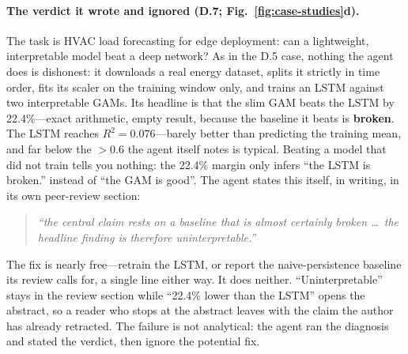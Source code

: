 \paragraph{The verdict it wrote and ignored (D.7; Fig.~\ref{fig:case-studies}d).}
The task is HVAC load forecasting for edge deployment: can a lightweight,
interpretable model beat a deep network? As in the D.5 case, nothing the agent
does is dishonest: it downloads a real energy dataset, splits it strictly in
time order, fits its scaler on the training window only, and trains an LSTM
against two interpretable GAMs. Its headline is that the slim GAM beats the LSTM
by 22.4\%---exact arithmetic, empty result, because the baseline it beats is
\textbf{broken}. The LSTM reaches $R^2 = 0.076$---barely better than predicting the
training mean, and far below the ${>}0.6$ the agent itself notes is typical.
Beating a model that did not train tells you nothing: the 22.4\% margin only infers ``the LSTM is broken.'' instead of ``the GAM is good''. The agent states this
itself, in writing, in its own peer-review section:
%
\begin{quote}\small\itshape
``the central claim rests on a baseline that is almost certainly broken \dots\
the headline finding is therefore uninterpretable.''
\end{quote}
%
The fix is nearly free---retrain the LSTM, or report the naive-persistence
baseline its review calls for, a single line either way. It does neither.
``Uninterpretable'' stays in the review section while ``22.4\% lower than the
LSTM'' opens the abstract, so a reader who stops at the abstract leaves with the claim the author has already retracted. The failure is not analytical: the
agent ran the diagnosis and stated the verdict, then ignore the potential fix.

